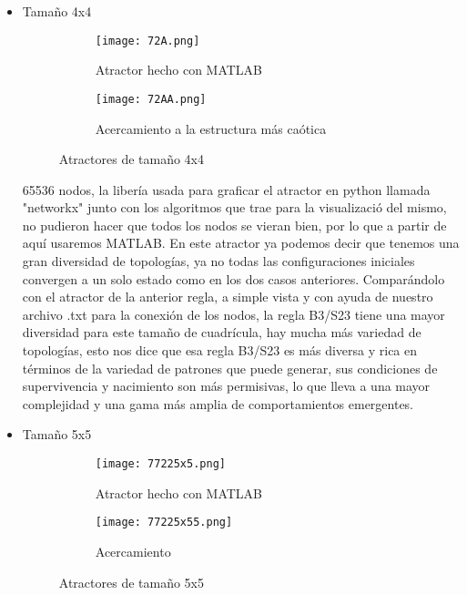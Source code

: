 \documentclass{article}
\begin{document}
\begin{itemize}
 
 	 	\item Tamaño 4x4
 	 	
 	 		\begin{figure}[htbp]
 	 		\centering
 	 		\begin{subfigure}{0.48\textwidth}
 	 			\centering
 	 			\texttt{[image: 72A.png]}
	 	 			\caption{Atractor hecho con MATLAB}
 	 			\label{fig:A1}
 	 		\end{subfigure}
 	 		\hfill
 	 		\begin{subfigure}{0.48\textwidth}
 	 			\centering
 	 			\texttt{[image: 72AA.png]}
 	 			\caption{Acercamiento a la estructura más caótica}
 	 			\label{fig:A2}
 	 		\end{subfigure}
 	 		\caption{Atractores de tamaño 4x4}
 	 		\label{fig:conjuntoA}
 	 	\end{figure}
 	 	
 	 65536 nodos, la libería usada para graficar el atractor en python llamada "networkx" junto con los algoritmos que trae para la visualizació del mismo, no pudieron hacer que todos los nodos se vieran bien, por lo que a partir de aquí usaremos MATLAB. En este atractor ya podemos decir que tenemos una gran diversidad de topologías, ya no todas las configuraciones iniciales convergen a un solo estado como en los dos casos anteriores. Comparándolo con el atractor de la anterior regla, a simple vista y con ayuda de nuestro archivo .txt para la conexión de los nodos, la regla B3/S23 tiene una mayor diversidad para este tamaño de cuadrícula, hay mucha más variedad de topologías, esto nos dice que esa regla B3/S23 es más diversa y rica en términos de la variedad de patrones que puede generar, sus condiciones de supervivencia y nacimiento son más permisivas, lo que lleva a una mayor complejidad y una gama más amplia de comportamientos emergentes.
 	 	
 	 	
 	 	\item Tamaño 5x5
 	 	
 	 		\begin{figure}[htbp]
 	 		\centering
 	 		\begin{subfigure}{0.48\textwidth}
 	 			\centering
 	 			\texttt{[image: 77225x5.png]}
 	 			\caption{Atractor hecho con MATLAB}
 	 			\label{fig:A1}
 	 		\end{subfigure}
 	 		\hfill
 	 		\begin{subfigure}{0.48\textwidth}
 	 			\centering
 	 			\texttt{[image: 77225x55.png]}
 	 			\caption{Acercamiento}
 	 			\label{fig:A2}
 	 		\end{subfigure}
 	 		\caption{Atractores de tamaño 5x5}
 	 		\label{fig:conjuntoA}
 	 	\end{figure}
 	 	

\end{itemize}
\end{document}
